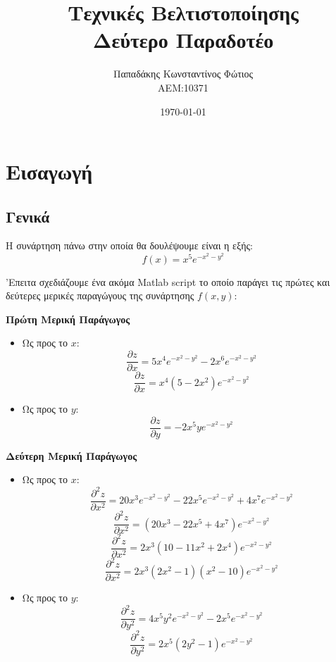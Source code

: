 \documentclass{report}
\begin{document}

\title{\Huge \bfseries Τεχνικές Βελτιστοποίησης \\ Δεύτερο Παραδοτέο} %
\author{Παπαδάκης Κωνσταντίνος Φώτιος\vspace{0.5cm} \\  ΑΕΜ:10371} %
\date{\today}
\maketitle

\tableofcontents

\chapter{Εισαγωγή}
\section{Γενικά}
Η συνάρτηση πάνω στην οποία θα δουλέψουμε είναι η εξής:
$$f(x) = x^5 e^{-x^2-y^2}$$

'Επειτα σχεδιάζουμε ένα ακόμα Matlab script
το οποίο παράγει τις πρώτες και δεύτερες μερικές παραγώγους της 
συνάρτησης $f(x,y)$:

\textbf{Πρώτη Μερική Παράγωγος}
\begin{itemize}
    \item Ως προς το $x$:
    $$\frac{\partial{z}}{\partial{x}} = 5x^4e^{-x^2-y^2} - 2x^6e^{-x^2-y^2}$$
    $$\frac{\partial{z}}{\partial{x}} = x^4(5-2x^2)e^{-x^2-y^2}$$
    \item Ως προς το $y$:
    $$\frac{\partial{z}}{\partial{y}} = -2x^{5}ye^{-x^2-y^2}$$

\end{itemize}

\textbf{Δεύτερη Μερική Παράγωγος}
\begin{itemize}
    \item Ως προς το $x$:
    $$\frac{\partial^2{z}}{\partial{x^2}} = 20x^{3}e^{-x^2-y^2}-22x^{5}e^{-x^2-y^2}+4x^{7}e^{-x^2-y^2}$$
    $$\frac{\partial^2{z}}{\partial{x^2}} = (20x^3 -22x^5 +4x^7)e^{-x^2-y^2}$$
    $$\frac{\partial^2{z}}{\partial{x^2}} = 2x^3(10-11x^2+2x^4)e^{-x^2-y^2}$$
    $$\frac{\partial^2{z}}{\partial{x^2}} = 2x^3(2x^2-1)(x^2-10)e^{-x^2-y^2}$$
    \item Ως προς το $y$:
    $$\frac{\partial^2{z}}{\partial{y^2}} = 4x^{5}y^{2}e^{-x^2-y^2} - 2x^{5}e^{-x^2-y^2}$$
    $$\frac{\partial^2{z}}{\partial{y^2}} = 2x^{5}(2y^2-1)e^{-x^2-y^2}$$
\end{itemize}
\end{document}
